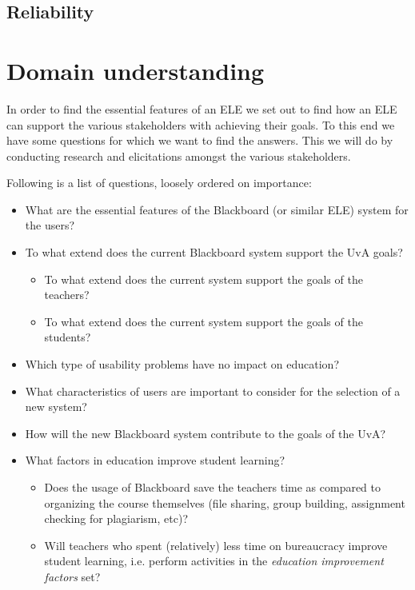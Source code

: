 \section{Reliability}


\chapter{Domain understanding}
\label{ch:understanding} 
In order to find the essential features of an ELE we set out to find how an ELE can support the various stakeholders with achieving their goals. To this end we have some questions for which we want to find the answers. This we will do by conducting research and elicitations amongst the various stakeholders.

Following is a list of questions, loosely ordered on importance:
\begin{itemize}
	\item What are the essential features of the Blackboard (or similar ELE) system for the users?

	\item To what extend does the current Blackboard system support the UvA goals?
	\begin{itemize}
		\item To what extend does the current system support the goals of the teachers?
		\item To what extend does the current system support the goals of the students?
	\end{itemize}
	
	\item Which type of usability problems have no impact on education?
	\item What characteristics of users are important to consider for the selection of a new system?
	\item How will the new Blackboard system contribute to the goals of the UvA?
	\item What factors in education improve student learning?
	\begin{itemize}
		\item Does the usage of Blackboard save the teachers time as compared to organizing the course themselves (file sharing, group building, assignment checking for plagiarism, etc)?
		\item Will teachers who spent (relatively) less time on bureaucracy improve student learning, i.e. perform activities in the \textit{education improvement factors} set?
	\end{itemize}
	
\end{itemize}



